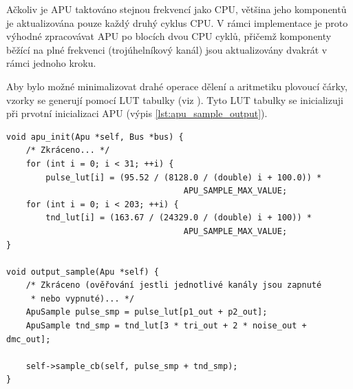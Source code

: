 Ačkoliv je APU taktováno stejnou frekvencí jako CPU, většina jeho komponentů je aktualizována pouze
každý druhý cyklus CPU. V rámci implementace je proto výhodné zpracovávat APU po blocích dvou CPU
cyklů, přičemž komponenty běžící na plné frekvenci (trojúhelníkový kanál) jsou aktualizovány dvakrát
v rámci jednoho kroku.

Aby bylo možné minimalizovat drahé operace dělení a aritmetiku plovoucí čárky, vzorky se generují pomocí LUT
tabulky (viz \cite{nesdev-apu-lut}). Tyto LUT tabulky se inicializuji při prvotní inicializaci APU (výpis
\ref{lst:apu_sample_output}).

\begin{listing}[htbp]
\begin{verbatim}
void apu_init(Apu *self, Bus *bus) {
    /* Zkráceno... */
    for (int i = 0; i < 31; ++i) {
        pulse_lut[i] = (95.52 / (8128.0 / (double) i + 100.0)) *
                                    APU_SAMPLE_MAX_VALUE;
    for (int i = 0; i < 203; ++i) {
        tnd_lut[i] = (163.67 / (24329.0 / (double) i + 100)) *
                                    APU_SAMPLE_MAX_VALUE;
}

void output_sample(Apu *self) {
    /* Zkráceno (ověřování jestli jednotlivé kanály jsou zapnuté
     * nebo vypnuté)... */
    ApuSample pulse_smp = pulse_lut[p1_out + p2_out];
    ApuSample tnd_smp = tnd_lut[3 * tri_out + 2 * noise_out + dmc_out];

    self->sample_cb(self, pulse_smp + tnd_smp);
}
\end{verbatim}
\caption{Generace vzorků pomocí LUT tabulky, která má předvypočítané hodnoty pomocí lineární
aproximace popsané v \cite{nesdev}.}
\label{lst:apu_sample_output}
\end{listing}
